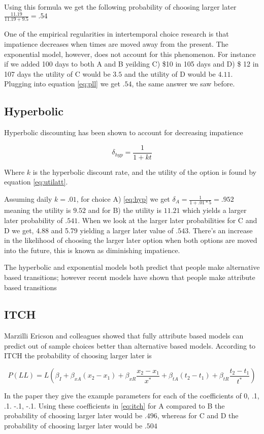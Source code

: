 \documentclass[]{article}
\begin{document}
Using this formula we get the following probability of choosing larger later $\frac{11.19}{11.19+9.5} = .54$

One of the empirical regularities in intertemporal choice research is that impatience decreases when times are moved away from the present. The exponential model, however, does not account for this phenomenon. For instance if we added 100 days to both A and B yeilding C) \$10 in 105 days and D) \$ 12 in 107 days the utility of C would be $3.5$ and the utility of D would be $4.11$. Plugging into equation \ref{eq:pll} we get $.54$, the same answer we saw before. 

\subsection{Hyperbolic}

Hyperbolic discounting has been shown to account for decreasing impatience

\begin{equation}\label{eq:hyp}
\delta_{hyp} = \frac{1}{1+kt}
\end{equation}

Where $k$ is the hyperbolic discount rate, and the utility of the option is found by equation \ref{eq:utilatt}.

Assuming daily $k = .01$, for choice A) \ref{eq:hyp} we get $\delta_A = \frac{1}{1+.01*5} = .952$ meaning the utility is $9.52$ and for B) the utility is $11.21$ which yields a larger later probability of $.541$. When we look at the larger later probabilities for C and D we get, 4.88 and  5.79 yielding a larger later value of $.543$. There's an increase in the likelihood of choosing the larger later option when both options are moved into the future, this is known as diminishing impatience. 

The hyperbolic and exponential models both predict that people make alternative based transitions; however recent models have shown that people make attribute based transitions

\cite{@Loewenstein1991} 

\subsection{ITCH}

Marzilli Ericson and colleagues showed that fully attribute based models can predict out of sample choices better than alternative based models. 
According to ITCH the probability of choosing larger later is

\begin{equation}\label{eq:itch}
	P(LL) = L \left(\beta_I + \beta_{xA}(x_2 - x_1) + \beta_{xR} \frac{x_2 - x_1}{x^*} + \beta_{tA}(t_2 - t_1) + \beta_{tR} \frac{t_2 - t_1}{t^*}\right)
\end{equation}

In the paper they give the example parameters for each of the coefficients of 0, .1, .1. -.1, -.1. Using these coefficients in \ref{eq:itch} for A compared to B the probability of choosing larger later would be $.496$, whereas for C and D the probability of choosing larger later would be $.504$
\end{document}
